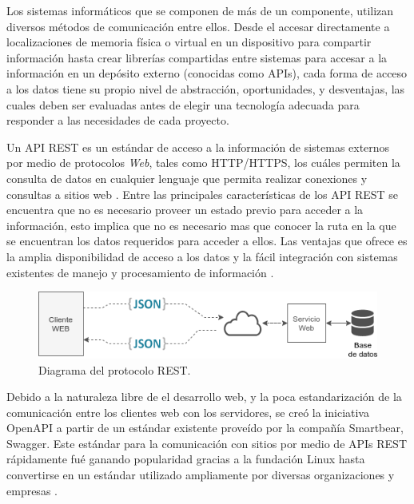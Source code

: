 
Los sistemas informáticos que se componen de más de un componente, utilizan diversos métodos de comunicación entre ellos. Desde el accesar directamente a localizaciones de memoria física o virtual en un dispositivo para compartir información hasta crear librerías compartidas entre sistemas para accesar a la información en un depósito externo (conocidas como APIs), cada forma de acceso a los datos tiene su propio nivel de abstracción, oportunidades, y desventajas, las cuales deben ser evaluadas antes de elegir una tecnología adecuada para responder a las necesidades de cada proyecto.

Un API REST es un estándar de acceso a la información de sistemas externos por medio de protocolos \textit{Web}, tales como HTTP/HTTPS, los cuáles permiten la consulta de datos en cualquier lenguaje que permita realizar conexiones y consultas a sitios web \cite{REST_API_design}. Entre las principales características de los API REST se encuentra que no es necesario proveer un estado previo para acceder a la información, esto implica que no es necesario mas que conocer la ruta en la que se encuentran los datos requeridos para acceder a ellos. Las ventajas que ofrece es la amplia disponibilidad de acceso a los datos y la fácil integración con sistemas existentes de manejo y procesamiento de información \cite{OpenAPI_example}.

\begin{figure}[!ht]
	\centering
	\includegraphics[width=.70\linewidth]{images/diagrams/REST.png}
	\caption{Diagrama del protocolo REST.}
	\label{fig:coms_nodos_raspberry}
\end{figure}


Debido a la naturaleza libre de el desarrollo web, y la poca estandarización de la comunicación entre los clientes web con los servidores, se creó la iniciativa OpenAPI a partir de un estándar existente proveído por la compañía Smartbear, Swagger. Este estándar para la comunicación con sitios por medio de APIs REST rápidamente fué ganando popularidad gracias a la fundación Linux hasta convertirse en un estándar utilizado ampliamente por diversas organizaciones y empresas \cite{OpenAPI_foundation}.

